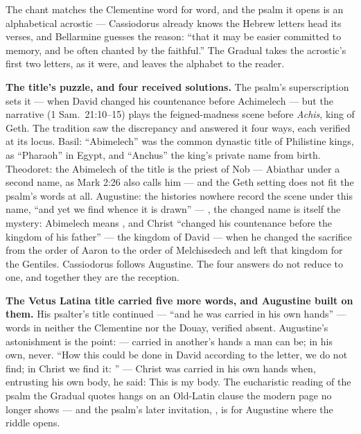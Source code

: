 The chant matches the Clementine word for word, and the psalm it opens is an
alphabetical acrostic --- Cassiodorus already knows the Hebrew letters head
its verses, and Bellarmine guesses the reason: ``that it may be easier
committed to memory, and be often chanted by the faithful.'' The Gradual
takes the acrostic's first two letters, as it were, and leaves the alphabet
to the reader.

\textbf{The title's puzzle, and four received solutions.} The psalm's
superscription sets it  ---
when David changed his countenance before Achimelech --- but the narrative
(1 Sam.\ 21:10--15) plays the feigned-madness scene before \textit{Achis},
king of Geth. The tradition saw the discrepancy and answered it four ways,
each verified at its locus. Basil: ``Abimelech'' was the common dynastic
title of Philistine kings, as ``Pharaoh'' in Egypt, and ``Anchus'' the
king's private name from birth. Theodoret: the Abimelech of the title is the
priest of Nob --- Abiathar under a second name, as Mark 2:26 also calls him
--- and the Geth setting does not fit the psalm's words at all. Augustine:
the histories nowhere record the scene under this name, ``and yet we find
whence it is drawn'' --- , the changed
name is itself the mystery: Abimelech means , and
Christ ``changed his countenance before the kingdom of his father'' --- the
kingdom of David --- when he changed the sacrifice from the order of Aaron to
the order of Melchisedech and left that kingdom for the Gentiles. Cassiodorus
follows Augustine. The four answers do not reduce to one, and together they
are the reception.

\textbf{The Vetus Latina title carried five more words, and Augustine built
on them.} His psalter's title continued 
--- ``and he was carried in his own hands'' --- words in neither the
Clementine nor the Douay, verified absent. Augustine's astonishment is the
point:  --- carried in another's hands a man can be; in his own,
never. ``How this could be done in David according to the letter, we do not
find; in Christ we find it: '' --- Christ
was carried in his own hands when, entrusting his own body, he said: This is
my body. The eucharistic reading of the psalm the Gradual quotes hangs on an
Old-Latin clause the modern page no longer shows --- and the psalm's later
invitation, , is for Augustine where the riddle
opens.

